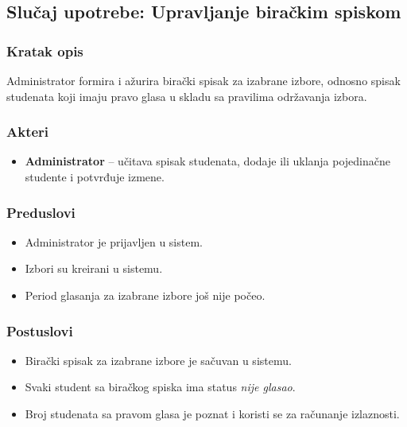 \subsection{Slučaj upotrebe: Upravljanje biračkim spiskom}

\subsubsection*{Kratak opis}
Administrator formira i ažurira birački spisak za izabrane izbore, odnosno spisak studenata koji imaju pravo glasa u skladu sa pravilima održavanja izbora.

\subsubsection*{Akteri}
\begin{itemize}
    \item \textbf{Administrator} -- učitava spisak studenata, dodaje ili uklanja pojedinačne studente i potvrđuje izmene.
\end{itemize}

\subsubsection*{Preduslovi}
\begin{itemize}
    \item Administrator je prijavljen u sistem.
    \item Izbori su kreirani u sistemu.
    \item Period glasanja za izabrane izbore još nije počeo.
\end{itemize}

\subsubsection*{Postuslovi}
\begin{itemize}
    \item Birački spisak za izabrane izbore je sačuvan u sistemu.
    \item Svaki student sa biračkog spiska ima status \textit{nije glasao}.
    \item Broj studenata sa pravom glasa je poznat i koristi se za računanje izlaznosti.
\end{itemize}

